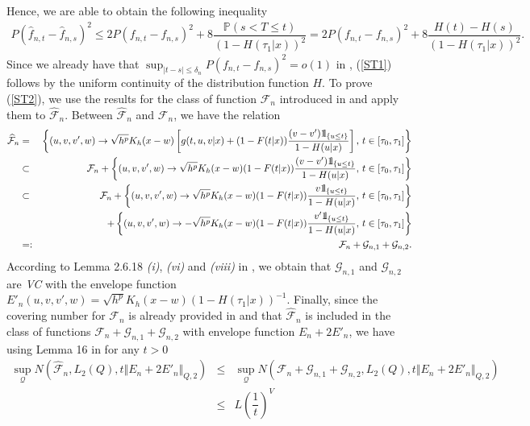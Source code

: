 \documentclass[12pt]{article}
\def\ind{ {{\rm 1}\hskip-2.2pt{\rm l}}}
\begin{document}
Hence, we are able to obtain the following inequality
\begin{eqnarray*}
P(\widehat{f}_{n,t}-\widehat{f}_{n,s})^2\leq 2P(f_{n,t}-f_{n,s})^2+8\dfrac{\mathbb{P}(s<T\leq t)}{(1-H(\tau_1|x))^2}=2P(f_{n,t}-f_{n,s})^2+8\dfrac{H(t)-H(s)}{(1-H(\tau_1|x))^2}.
\end{eqnarray*}
Since we already have that $\sup_{|t-s|\leq \delta_n} P(f_{n,t}-f_{n,s})^2=o(1)$ in \cite{Escobar2019}, (\ref{ST1}) follows by the uniform continuity of the distribution function $H$. To prove (\ref{ST2}), we use the results for the class of function $\mathcal{F}_n$ introduced in \cite{Escobar2019} and apply them to $\widehat{\mathcal{F}}_n$.  Between $\widehat{\mathcal{F}}_n$ and $\mathcal{F}_n$, we have the relation
\begin{eqnarray*}
\widehat{\mathcal{F}}_n&=&\left\{(u,v,v',w)\rightarrow\sqrt{h^p}K_h(x-w)\left[g(t,u,v|x)+(1-F(t|x))\dfrac{(v-v')\ind_{\{u\leq t\}}}{1-H(u|x)}\right],\, t\in[\tau_0,\tau_1]\right\}\\
&\subset&\mathcal{F}_n+\left\{(u,v,v',w)\rightarrow\sqrt{h^p}K_h(x-w)(1-F(t|x))\dfrac{(v-v')\ind_{\{u\leq t\}}}{1-H(u|x)},\, t\in[\tau_0,\tau_1]\right\}\\
&\subset&\mathcal{F}_n+\left\{(u,v,v',w)\rightarrow\sqrt{h^p}K_h(x-w)(1-F(t|x))\dfrac{v\ind_{\{u\leq t\}}}{1-H(u|x)},\, t\in[\tau_0,\tau_1]\right\}\\
&&+\left\{(u,v,v',w)\rightarrow-\sqrt{h^p}K_h(x-w)(1-F(t|x))\dfrac{v'\ind_{\{u\leq t\}}}{1-H(u|x)},\, t\in[\tau_0,\tau_1]\right\}\\
&=:&\mathcal{F}_n+\mathcal{G}_{n,1}+\mathcal{G}_{n,2}.
\end{eqnarray*}
According to Lemma 2.6.18 {\it(i)}, {\it(vi)} and {\it(viii)} in \cite{Vaart1996}, we obtain that $\mathcal{G}_{n,1}$ and $\mathcal{G}_{n,2}$ are \textit{VC} with the envelope function $E'_n(u,v,v',w)=\sqrt{h^p}K_h(x-w)(1-H(\tau_1|x))^{-1}$. Finally, since the covering number for $\mathcal{F}_n$ is already provided in \cite{Escobar2019} and that $\widehat{\mathcal{F}}_n$ is included in the class of functions $\mathcal{F}_n+\mathcal{G}_{n,1}+\mathcal{G}_{n,2}$ with envelope function $E_n+2E'_n$, we have using Lemma 16 in \cite{Nolan1987} for any $t>0$ 
\begin{eqnarray*}
\sup_\mathcal{Q} N(\widehat{\mathcal{F}}_n,L_2(Q),t\Vert E_n+2E'_n\Vert_{Q,2})&\leq&\sup_\mathcal{Q} N(\mathcal{F}_n+\mathcal{G}_{n,1}+\mathcal{G}_{n,2},L_2(Q),t\Vert E_n+2E'_n\Vert_{Q,2})\\
&\leq& L\left(\dfrac{1}{t}\right)^V
\end{eqnarray*}
\end{document}
